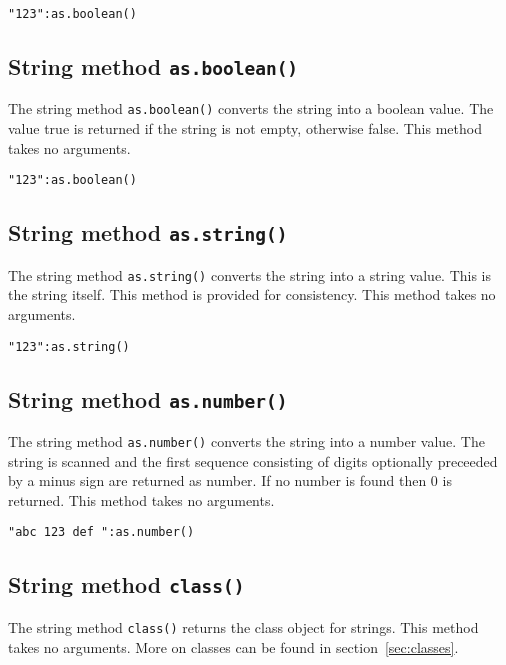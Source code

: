 \documentclass[11pt,a4paper]{scrbook}
\begin{document}
\begin{lstlisting}[language=BibTool]
"123":as.boolean()
\end{lstlisting}

\subsection{String method \texttt{as.boolean()}}

The string method \texttt{as.boolean()} converts the string into a boolean
value. The value true is returned if the string is not empty, otherwise false.
This method takes no arguments.

\begin{lstlisting}[language=BibTool]
"123":as.boolean()
\end{lstlisting}

\subsection{String method \texttt{as.string()}}

The string method \texttt{as.string()} converts the string into a string
value. This is the string itself. This method is provided for consistency.
This method takes no arguments.

\begin{lstlisting}[language=BibTool]
"123":as.string()
\end{lstlisting}

\subsection{String method \texttt{as.number()}}

The string method \texttt{as.number()} converts the string into a number
value. The string is scanned and the first sequence consisting of digits
optionally preceeded by a minus sign are returned as number. If no number is
found then 0 is returned. This method takes no arguments.

\begin{lstlisting}[language=BibTool]
"abc 123 def ":as.number()
\end{lstlisting}

\subsection{String method \texttt{class()}}

The string method \texttt{class()} returns the class object for strings. This
method takes no arguments. More on classes can be found in
section~\ref{sec:classes}.
\end{document}
